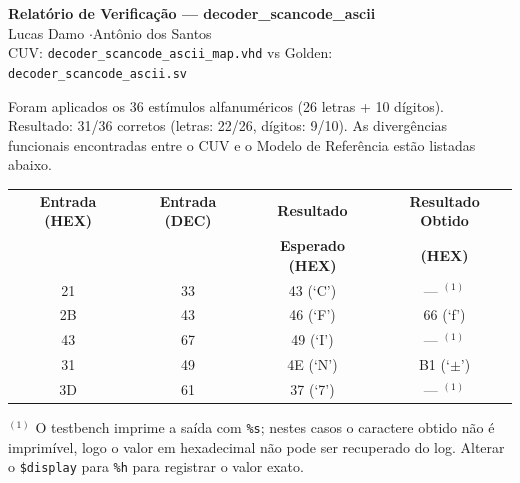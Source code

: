 \documentclass[a4paper,11pt]{article}
\begin{document}
\begin{center}
{\large\bfseries Relatório de Verificação --- decoder\_scancode\_ascii}\\[4pt]
Lucas Damo \quad$\cdot$\quad Antônio dos Santos\\[4pt]
CUV: \texttt{decoder\_scancode\_ascii\_map.vhd} \quad vs \quad Golden: \texttt{decoder\_scancode\_ascii.sv}
\end{center}

\noindent
Foram aplicados os 36 estímulos alfanuméricos (26 letras + 10 dígitos).
Resultado: 31/36 corretos (letras: 22/26, dígitos: 9/10).
As divergências funcionais encontradas entre o CUV e o Modelo de Referência
estão listadas abaixo.

\vspace{8pt}
\begin{center}
\begin{tabular}{|c|c|c|c|}
\hline
\textbf{Entrada (HEX)} & \textbf{Entrada (DEC)} & \textbf{Resultado} & \textbf{Resultado Obtido} \\
 & & \textbf{Esperado (HEX)} & \textbf{(HEX)} \\
\hline
21 & 33 & 43 (`C') & --- $^{(1)}$ \\ \hline
2B & 43 & 46 (`F') & 66 (`f') \\ \hline
43 & 67 & 49 (`I') & --- $^{(1)}$ \\ \hline
31 & 49 & 4E (`N') & B1 (`$\pm$') \\ \hline
3D & 61 & 37 (`7') & --- $^{(1)}$ \\ \hline
\end{tabular}
\end{center}

\vspace{4pt}
\noindent
$^{(1)}$ O testbench imprime a saída com \texttt{\%s}; nestes casos o caractere obtido não
é imprimível, logo o valor em hexadecimal não pode ser recuperado do log.
Alterar o \texttt{\$display} para \texttt{\%h} para registrar o valor exato.
\end{document}
